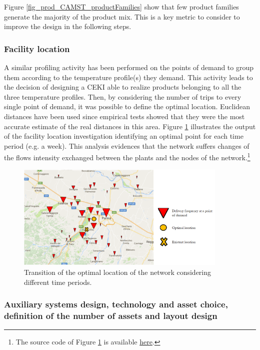 Figure \ref{fig_prod_CAMST_productFamilies} show that few product families generate the majority of the product mix. This is a key metric to consider to improve the design in the following steps.

\subsubsection{Facility location}

A similar profiling activity has been performed on the points of demand to group them according to the temperature profile(s) they demand. This activity leads to the decision of designing a CEKI able to realize products belonging to all the three temperature profiles. Then, by considering the number of trips to every single point of demand, it was possible to define the optimal location. Euclidean distances have been used since empirical tests showed that they were the most accurate estimate of the real distances in this area. Figure \ref{fig_prod_CAMST_ubicazione} illustrates the output of the facility location investigation identifying an optimal point for each time period (e.g. a week). This analysis evidences that the network suffers changes of the flows intensity exchanged between the plants and the nodes of the network.\footnote{The source code of Figure \ref{fig_prod_CAMST_ubicazione} is available \href{https://github.com/aletuf93/logproj/blob/master/examples/PROD_01\%20Facility\%20location.ipynb}{here}.}

\begin{figure}[hbt!]
\centering
\includegraphics[width=0.9\textwidth]{sectionProduction/design_plant_figures/fig_prod_CAMST_ubicazione.png}
\captionsetup{type=figure}
\caption{Transition of the optimal location of the network considering different time periods.}
\label{fig_prod_CAMST_ubicazione}
\end{figure}

\subsubsection{Auxiliary systems design, technology and asset choice, definition of the number of assets and layout design}

